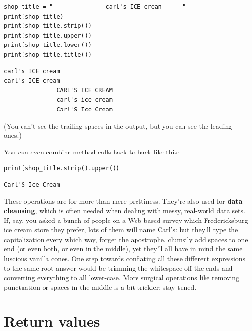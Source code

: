 \begin{Verbatim}[fontsize=\small,samepage=true,frame=single,framesep=3mm]
shop_title = "               carl's ICE cream      "
print(shop_title)
print(shop_title.strip())
print(shop_title.upper())
print(shop_title.lower())
print(shop_title.title())
\end{Verbatim}

\begin{Verbatim}[fontsize=\small,samepage=true,frame=leftline,framesep=5mm,framerule=1mm]
               carl's ICE cream         
carl's ICE cream
               CARL'S ICE CREAM         
               carl's ice cream         
               Carl'S Ice Cream         
\end{Verbatim}

(You can't see the trailing spaces in the output, but you can see the leading
ones.)

You can even combine method calls back to back like this:

\begin{Verbatim}[fontsize=\small,samepage=true,frame=single,framesep=3mm]
print(shop_title.strip().upper())
\end{Verbatim}

\begin{Verbatim}[fontsize=\small,samepage=true,frame=leftline,framesep=5mm,framerule=1mm]
Carl'S Ice Cream
\end{Verbatim}

These operations are for more than mere prettiness. They're also used for
\textbf{data cleansing}, which is often needed when dealing with messy,
real-world data sets. If, say, you asked a bunch of people on a Web-based
survey which Fredericksburg ice cream store they prefer, lots of them will name
Carl's: but they'll type the capitalization every which way, forget the
apostrophe, clumsily add spaces to one end (or even both, or even in the
middle), yet they'll all have in mind the same luscious vanilla cones. One step
towards conflating all these different expressions to the same root answer
would be trimming the whitespace off the ends and converting everything to all
lower-case. More surgical operations like removing punctuation or spaces in the
middle is a bit trickier; stay tuned.

\section{Return values}

